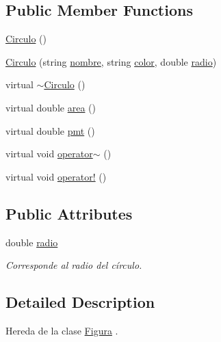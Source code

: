 \subsection*{Public Member Functions}
\begin{DoxyCompactItemize}
\item 
\hyperlink{class_circulo_a6933bf908b78a4167684081a3a8f257f}{Circulo} ()
\item 
\hyperlink{class_circulo_a14db1f1a04f7adfa9f3e785fce82419c}{Circulo} (string \hyperlink{class_figura_a5be336617ed8a4d4f28115297b38da02}{nombre}, string \hyperlink{class_figura_a9f519b9504b95440f124a3099070e952}{color}, double \hyperlink{class_circulo_aba57029c5768d344c4ef536e5323122b}{radio})
\item 
virtual \hyperlink{class_circulo_a8efe39e0e89487519cd802f0738d3bf4}{$\sim$\+Circulo} ()
\item 
virtual double \hyperlink{class_circulo_aded0c4ee374eb000f59d8d8da01ad72d}{area} ()
\item 
virtual double \hyperlink{class_circulo_afd102e74c7b2c368979f8ad042a02805}{pmt} ()
\item 
virtual void \hyperlink{class_circulo_a8db226b0c3bad5b8a01d60afb45838c7}{operator$\sim$} ()
\item 
virtual void \hyperlink{class_circulo_a64bd2cabfdbca872d44bf1eb13f59cbb}{operator!} ()
\end{DoxyCompactItemize}
\subsection*{Public Attributes}
\begin{DoxyCompactItemize}
\item 
double \hyperlink{class_circulo_aba57029c5768d344c4ef536e5323122b}{radio}
\begin{DoxyCompactList}\small\item\em Corresponde al radio del círculo. \end{DoxyCompactList}\end{DoxyCompactItemize}


\subsection{Detailed Description}
Hereda de la clase \hyperlink{class_figura}{Figura} . 

